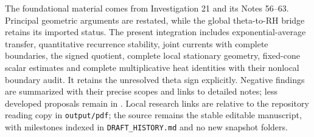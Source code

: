 \documentclass[11pt]{article}
\numberwithin{equation}{section}
\theoremstyle{definition}
\theoremstyle{remark}
\begin{document}
The foundational material comes from Investigation 21
\cite{BakerTheta} and its Notes 56--63. Principal geometric arguments
are restated, while the global theta-to-RH bridge retains its imported
status. The present integration includes exponential-average transfer,
quantitative recurrence stability, joint currents with complete boundaries,
the signed quotient, complete local stationary geometry, fixed-cone
scalar estimates and complete multiplicative heat identities with their
nonlocal boundary audit. It retains the unresolved theta sign explicitly. Negative findings are
summarized with their precise scopes and links to detailed notes; less
developed proposals remain in \cite{ThetaOverview,ThetaResearchPaths}. Local research links are relative
to the repository reading copy in \texttt{output/pdf}; the source
remains the stable editable manuscript, with milestones indexed in
\texttt{DRAFT\_HISTORY.md} and no new snapshot folders.
\end{document}
